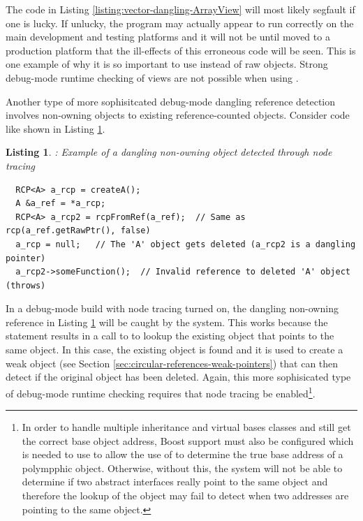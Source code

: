 \documentclass[pdf,ps2pdf,11pt]{SANDreport}
\newtheorem{listing}{Listing}
\begin{document}
The code in Listing {}\ref{listing:vector-dangling-ArrayView} will
most likely segfault if one is lucky.  If unlucky, the program may
actually appear to run correctly on the main development and testing
platforms and it will not be until moved to a production platform that
the ill-effects of this erroneous code will be seen.  This is one
example of why it is so important to use {} instead of raw
{} objects.  Strong debug-mode runtime checking of
{} views are not possible when using
{}.

Another type of more sophisitcated debug-mode dangling reference
detection involves non-owning {} objects to existing
reference-counted objects.  Consider code like shown in Listing
{}\ref{listing:RCP-nonowning-dangling-ref}.


{}\begin{listing}: Example of a dangling non-owning {} object
detected through node tracing
\label{listing:RCP-nonowning-dangling-ref}
{\small\begin{verbatim}
  RCP<A> a_rcp = createA();
  A &a_ref = *a_rcp;
  RCP<A> a_rcp2 = rcpFromRef(a_ref);  // Same as rcp(a_ref.getRawPtr(), false)
  a_rcp = null;   // The 'A' object gets deleted (a_rcp2 is a dangling pointer)
  a_rcp2->someFunction();  // Invalid reference to deleted 'A' object (throws)
\end{verbatim}}
\end{listing}


In a debug-mode build with node tracing turned on, the dangling
non-owning {} reference {} in Listing
{}\ref{listing:RCP-nonowning-dangling-ref} will be caught by the
system.  This works because the statement {}
results in a call to {} to
lookup the existing {} object that points to the same
{} object.  In this case, the existing {} object
is found and it is used to create a weak {} object (see
Section {}\ref{sec:circular-references-weak-pointers}) that can then
detect if the original {} object has been deleted.  Again,
this more sophisicated type of debug-mode runtime checking requires
that node tracing be enabled\footnote{In order to handle multiple
inheritance and virtual bases classes and still get the correct base
object address, Boost support must also be configured which is needed
to use {} to allow the use of
{} to determine the true base address
of a polympphic object.  Otherwise, without this, the system will not
be able to determine if two abstract interfaces really point to the
same object and therefore the lookup of the {} object may
fail to detect when two addresses are pointing to the same object.}.
\end{document}
